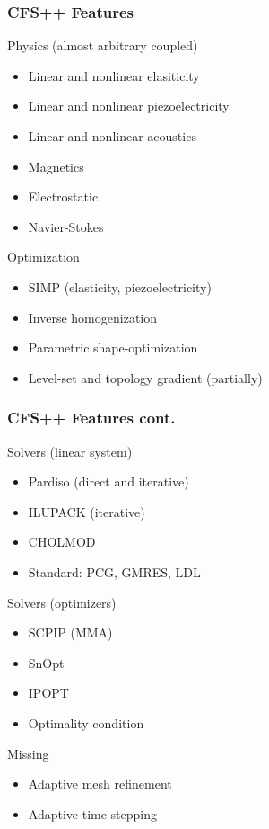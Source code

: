 \documentclass{beamer}
\begin{document}
\begin{frame}
\frametitle{CFS++ Features}
Physics (almost arbitrary coupled)
\begin{itemize}
  \item Linear and nonlinear elasiticity
  \item Linear and nonlinear piezoelectricity
  \item Linear and nonlinear acoustics
  \item Magnetics
  \item Electrostatic
  \item Navier-Stokes
\end{itemize}
Optimization
\begin{itemize}
  \item SIMP (elasticity, piezoelectricity)
  \item Inverse homogenization
  \item Parametric shape-optimization
  \item Level-set and topology gradient (partially)
\end{itemize}
\end{frame}

\begin{frame}
\frametitle{CFS++ Features cont.}

Solvers (linear system)
\begin{itemize}
  \item Pardiso (direct and iterative)
  \item ILUPACK (iterative)
  \item CHOLMOD
  \item Standard: PCG, GMRES, LDL
\end{itemize}
Solvers (optimizers)
\begin{itemize}
  \item SCPIP (MMA)
  \item SnOpt
  \item IPOPT
  \item Optimality condition
\end{itemize}
Missing
\begin{itemize}
  \item Adaptive mesh refinement
  \item Adaptive time stepping
\end{itemize}
\end{frame}
\end{document}
